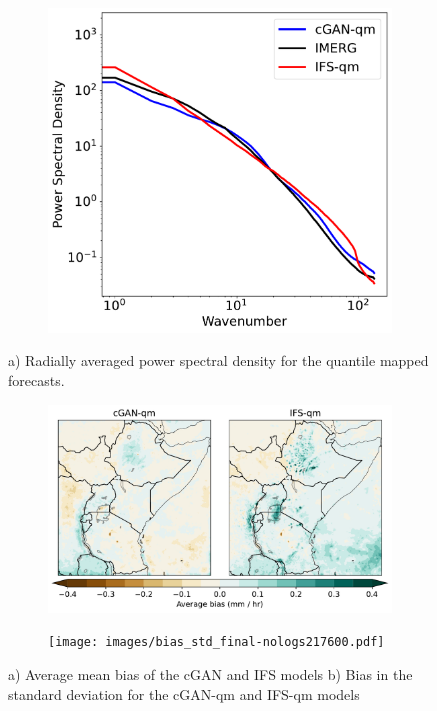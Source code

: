 \documentclass[../main.tex]{subfiles}
\begin{document}
\begin{figure}[!ht]
     \centering
     \begin{subfigure}{0.48\textwidth}
     \includegraphics[width=\textwidth]{images/rapsd_final-nologs_217600.pdf}
     \caption{}
     \end{subfigure}
     
     \caption{a) Radially averaged power spectral density for the quantile mapped forecasts. 
}
     \label{fig:rapsd}
\end{figure}

\begin{figure}[!ht]
    \centering
    \begin{subfigure}{0.8\textwidth}
    \centering
     \includegraphics[width=\textwidth]{images/bias_final-nologs217600.pdf}
     \caption{}
     \end{subfigure}
     \begin{subfigure}{0.8\textwidth}
    \centering
     \texttt{[image: images/bias\_std\_final-nologs217600.pdf]}
     \caption{}
     \end{subfigure}
    
     \caption{a) Average mean bias of the cGAN and IFS models b) Bias in the standard deviation for the cGAN-qm and IFS-qm models }
     \label{fig:bias}
\end{figure}
\end{document}
